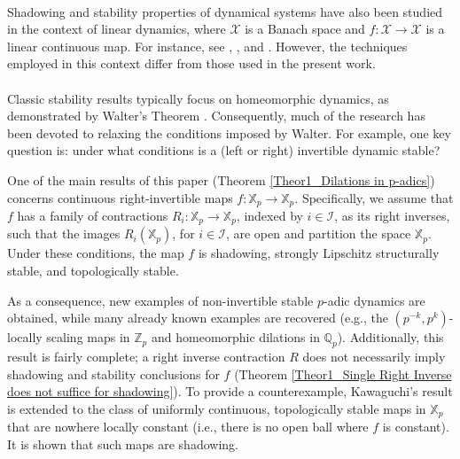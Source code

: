 \documentclass[a4paper, 12pt]{article}
\theoremstyle{definition}
\begin{document}
	
	
	\paragraph{}	
	Shadowing and stability properties of dynamical systems have also been studied in the context of linear dynamics, where $\mathcal{X}$ is a Banach space and $f: \mathcal{X} \to \mathcal{X}$ is a linear continuous map. For instance, see \cite{Bernardes_Messaoudi-Shadowing_and_Structural_Stability_for_Operators}, \cite{Bernarde_Cirilo_Darji_Messaoudi_Pujals-Expansivity_and_Shadowing_in_Linear_Dynamics}, and \cite{Mahler-An_Interpolation_Series_for_Continuous_Functions_of_a_p-adic_Variable}. However, the techniques employed in this context differ from those used in the present work. 
	
	
	
	\paragraph{}
	
	Classic stability results typically focus on homeomorphic dynamics, as demonstrated by Walter's Theorem \cite{Walters_On_the_Pseudo_Orbit_Tracing_Property_and_its_relationship_to_Stability}. Consequently, much of the research has been devoted to relaxing the conditions imposed by Walter. For example, one key question is: under what conditions is a (left or right) invertible dynamic stable? 
	
	\medskip
	
	One of the main results of this paper (Theorem \ref{Theor1_Dilations in p-adics}) concerns continuous right-invertible maps $f:\mathbb{X}_{p} \to \mathbb{X}_{p} $. Specifically, we assume that $f$ has a family of contractions  $R_{i}:\mathbb{X}_p\rightarrow \mathbb{X}_p$, indexed by $i \in \mathcal{I}$, as its right inverses, such that the images $R_{i} \left(  \mathbb{X}_{p}  \right) $, for $i \in \mathcal{I}$, are open and partition the space $\mathbb{X}_{p}$. Under these conditions, the map $f$ is shadowing, strongly Lipschitz structurally stable, and topologically stable. 
	
	As a consequence, new examples of non-invertible stable $p$-adic dynamics are obtained, while many already known examples are recovered (e.g., the $ \left(  p^{-k}, p^{k}  \right) $-locally scaling maps in $\mathbb{Z}_{p}$ and homeomorphic dilations in $\mathbb{Q}_{p}$). Additionally, this result is fairly complete; a right inverse contraction $R$ does not necessarily imply shadowing and stability conclusions for $f$ (Theorem \ref{Theor1_Single Right Inverse does not suffice for shadowing}). 
	To provide a counterexample, Kawaguchi's result \cite[Theorem 1.1]{Kawaguchi_Topological_Stability_and_Shadowing_of_Zero-dimensional_Dynamical_Systems} is extended to the class of uniformly continuous, topologically stable maps in $\mathbb{X}_{p}$ that are nowhere locally constant (i.e., there is no open ball where $f$ is constant). It is shown that such maps are shadowing. 
	
\end{document}
